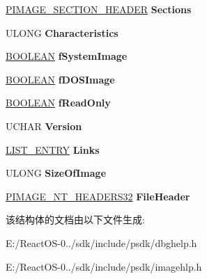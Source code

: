 \begin{DoxyCompactItemize}
\hyperlink{struct___i_m_a_g_e___s_e_c_t_i_o_n___h_e_a_d_e_r}{P\+I\+M\+A\+G\+E\+\_\+\+S\+E\+C\+T\+I\+O\+N\+\_\+\+H\+E\+A\+D\+ER} {\bfseries Sections}
\item 
\mbox{\label{struct___l_o_a_d_e_d___i_m_a_g_e_a3ea0572ebb8063e67b07bf86bf6a125f}} 
U\+L\+O\+NG {\bfseries Characteristics}
\item 
\mbox{\label{struct___l_o_a_d_e_d___i_m_a_g_e_a231f997ea3ab03250a23989f1154040f}} 
\hyperlink{_processor_bind_8h_a112e3146cb38b6ee95e64d85842e380a}{B\+O\+O\+L\+E\+AN} {\bfseries f\+System\+Image}
\item 
\mbox{\label{struct___l_o_a_d_e_d___i_m_a_g_e_abd14b5b5ed693ddca49f528fd6abf0cd}} 
\hyperlink{_processor_bind_8h_a112e3146cb38b6ee95e64d85842e380a}{B\+O\+O\+L\+E\+AN} {\bfseries f\+D\+O\+S\+Image}
\item 
\mbox{\label{struct___l_o_a_d_e_d___i_m_a_g_e_abfa7463a3a300cf09ee97918c4173243}} 
\hyperlink{_processor_bind_8h_a112e3146cb38b6ee95e64d85842e380a}{B\+O\+O\+L\+E\+AN} {\bfseries f\+Read\+Only}
\item 
\mbox{\label{struct___l_o_a_d_e_d___i_m_a_g_e_a906a8faa13319856894ff5c8b5298b54}} 
U\+C\+H\+AR {\bfseries Version}
\item 
\mbox{\label{struct___l_o_a_d_e_d___i_m_a_g_e_a2ed118c1b3b99c0cf9704cb29d9255fa}} 
\hyperlink{struct___l_i_s_t___e_n_t_r_y}{L\+I\+S\+T\+\_\+\+E\+N\+T\+RY} {\bfseries Links}
\item 
\mbox{\label{struct___l_o_a_d_e_d___i_m_a_g_e_a6dc3a8112ced7bce9b2d04adde678ca0}} 
U\+L\+O\+NG {\bfseries Size\+Of\+Image}
\item 
\mbox{\label{struct___l_o_a_d_e_d___i_m_a_g_e_a9202b7932dca21b0d2bb5bce3df5ca28}} 
\hyperlink{struct___i_m_a_g_e___n_t___h_e_a_d_e_r_s}{P\+I\+M\+A\+G\+E\+\_\+\+N\+T\+\_\+\+H\+E\+A\+D\+E\+R\+S32} {\bfseries File\+Header}
\end{DoxyCompactItemize}


该结构体的文档由以下文件生成\+:\begin{DoxyCompactItemize}
\item 
E\+:/\+React\+O\+S-\/0../sdk/include/psdk/dbghelp.\+h\item 
E\+:/\+React\+O\+S-\/0../sdk/include/psdk/imagehlp.\+h\end{DoxyCompactItemize}
